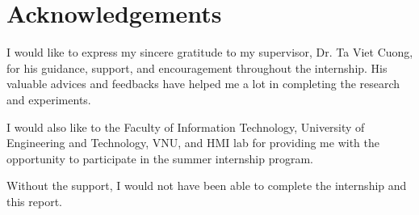 \chapter*{Acknowledgements}

I would like to express my sincere gratitude to my supervisor, Dr. Ta Viet Cuong, for his guidance, support, and encouragement throughout the internship. His valuable advices and feedbacks have helped me a lot in completing the research and experiments. \par
I would also like to the Faculty of Information Technology, University of Engineering and Technology, VNU, and HMI lab for providing me with the opportunity to participate in the summer internship program. \par
Without the support, I would not have been able to complete the internship and this report. \par